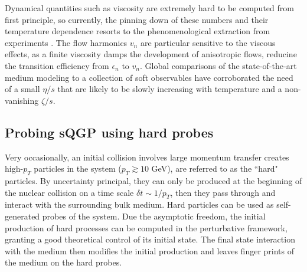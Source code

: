 Dynamical quantities such as viscosity are extremely hard to be computed from first principle, so currently, the pinning down of these numbers and their temperature dependence resorts to the phenomenological extraction from experiments \cite{Muronga:2004sf, Chaudhuri:2006jd, Romatschke:2007mq, Dusling:2007gi, Song:2007ux, Luzum:2008cw}.
The flow harmonics $v_n$ are particular sensitive to the viscous effects, as a finite viscosity damps the development of anisotropic flows, reducine the transition efficiency from $\epsilon_n$ to $v_n$.
Global comparisons of the state-of-the-art medium modeling to a collection of soft observables have corroborated the need of a small $\eta/s$ that are likely to be slowly increasing with temperature and a non-vanishing $\zeta/s$.

\subsection{Probing sQGP using hard probes}
Very occasionally, an initial collision involves large momentum transfer creates high-$p_T$ particles in the system ($p_T\gtrsim 10$ GeV), are referred to as the ``hard" particles.
By uncertainty principal, they can only be produced at the beginning of the nuclear collision on a time scale $\delta t \sim 1/p_T$, then they pass through and interact with the surrounding bulk medium.
Hard particles can be used as self-generated probes of the system.
Due the asymptotic freedom, the initial production of hard processes can be computed in the perturbative framework, granting a good theoretical control of its initial state.
The final state interaction with the medium then modifies the initial production and leaves finger prints of the medium on the hard probes.

